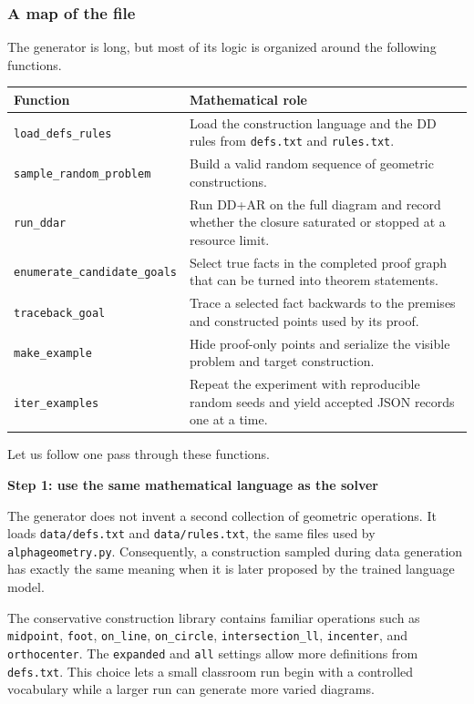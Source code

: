 \documentclass[reqno]{amsart}
\newcommand{\examplepart}[1]{%
    \par\medskip
    \noindent\textbf{\color{agblue}#1}\par\smallskip\noindent
}
\DeclareMathOperator{\1}{\textbf{1}}
\begin{document}
\subsubsection{A map of the file}

The generator is long, but most of its logic is organized around the following
functions.

\begin{center}
\begin{tabular}{p{}p{}}
\textbf{Function} & \textbf{Mathematical role} \\
\hline
\texttt{load\_defs\_rules} & Load the construction language and the DD rules
from \texttt{defs.txt} and \texttt{rules.txt}. \\
\texttt{sample\_random\_problem} & Build a valid random sequence of geometric
constructions. \\
\texttt{run\_ddar} & Run DD+AR on the full diagram and record whether the
closure saturated or stopped at a resource limit. \\
\texttt{enumerate\_candidate\_goals} & Select true facts in the completed
proof graph that can be turned into theorem statements. \\
\texttt{traceback\_goal} & Trace a selected fact backwards to the premises and
constructed points used by its proof. \\
\texttt{make\_example} & Hide proof-only points and serialize the visible
problem and target construction. \\
\texttt{iter\_examples} & Repeat the experiment with reproducible random seeds
and yield accepted JSON records one at a time. \\
\end{tabular}
\end{center}

Let us follow one pass through these functions.

\examplepart{Step 1: use the same mathematical language as the solver}

The generator does not invent a second collection of geometric operations. It
loads \verb|data/defs.txt| and \verb|data/rules.txt|, the same files used by
\verb|alphageometry.py|. Consequently, a construction sampled during data
generation has exactly the same meaning when it is later proposed by the
trained language model.

The conservative construction library contains familiar operations such as
\verb|midpoint|, \verb|foot|, \verb|on_line|, \verb|on_circle|,
\verb|intersection_ll|, \verb|incenter|, and \verb|orthocenter|. The
\verb|expanded| and \verb|all| settings allow more definitions from
\verb|defs.txt|. This choice lets a small classroom run begin with a controlled
vocabulary while a larger run can generate more varied diagrams.
\end{document}
